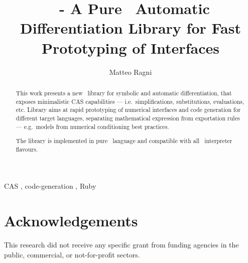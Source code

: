 \documentclass[preprint, 12pt, a4paper,review]{elsarticle}
\begin{document}
\begin{frontmatter}

\title{\ragnicas~- A Pure \Ruby~Automatic Differentiation Library for Fast Prototyping of Interfaces}

\author[ragni]{Matteo Ragni}
\address[ragni]{Department of Industrial Engineering, University of Trento, 9, Sommarive, Povo di Trento, Italy}

\begin{abstract}

This work presents a new \Ruby~library for symbolic and automatic differentiation, that exposes minimalistic CAS capabilities --- i.e.\ simplifications, substitutions, evaluations, etc. Library aims at rapid prototyping of numerical interfaces and code generation for different target languages, separating mathematical expression from exportation rules --- e.g.\ models from numerical conditioning best practices.

The library is implemented in pure \Ruby~language and compatible with all \Ruby~interpreter flavours.

\end{abstract}

\begin{keyword}
CAS \sep{} code-generation \sep{} Ruby
\end{keyword}

\end{frontmatter}

\linenumbers{}








\section*{Acknowledgements}
\label{sec:acknowledgements}
This research did not receive any specific grant from funding agencies in the public, commercial, or not-for-profit sectors.

\end{document}
